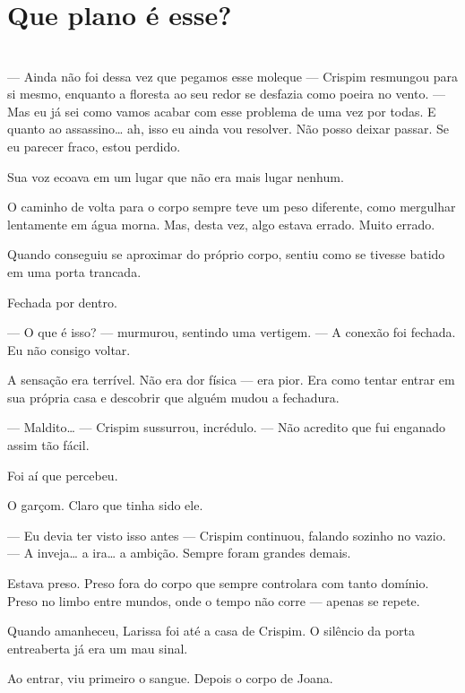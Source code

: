 \newpage


\ifdefined\useChapters
\chapter{Que plano é esse?}
\else
\chapter{}
\fi

— Ainda não foi dessa vez que pegamos esse moleque — Crispim resmungou para si mesmo, enquanto a floresta ao seu redor se desfazia como poeira no vento. — Mas eu já sei como vamos acabar com esse problema de uma vez por todas. E quanto ao assassino… ah, isso eu ainda vou resolver. Não posso deixar passar. Se eu parecer fraco, estou perdido.

Sua voz ecoava em um lugar que não era mais lugar nenhum.

O caminho de volta para o corpo sempre teve um peso diferente, como mergulhar lentamente em água morna. Mas, desta vez, algo estava errado. Muito errado.

Quando conseguiu se aproximar do próprio corpo, sentiu como se tivesse batido em uma porta trancada.

Fechada por dentro.

— O que é isso? — murmurou, sentindo uma vertigem. — A conexão foi fechada. Eu não consigo voltar.  

A sensação era terrível.  
Não era dor física — era pior.  
Era como tentar entrar em sua própria casa e descobrir que alguém mudou a fechadura.

— Maldito… — Crispim sussurrou, incrédulo. — Não acredito que fui enganado assim tão fácil.

Foi aí que percebeu.

O garçom.  
Claro que tinha sido ele.

— Eu devia ter visto isso antes — Crispim continuou, falando sozinho no vazio. — A inveja… a ira… a ambição. Sempre foram grandes demais.

Estava preso.  
Preso fora do corpo que sempre controlara com tanto domínio.  
Preso no limbo entre mundos, onde o tempo não corre — apenas se repete.

\bigskip

Quando amanheceu, Larissa foi até a casa de Crispim.  
O silêncio da porta entreaberta já era um mau sinal.

Ao entrar, viu primeiro o sangue.  
Depois o corpo de Joana.

